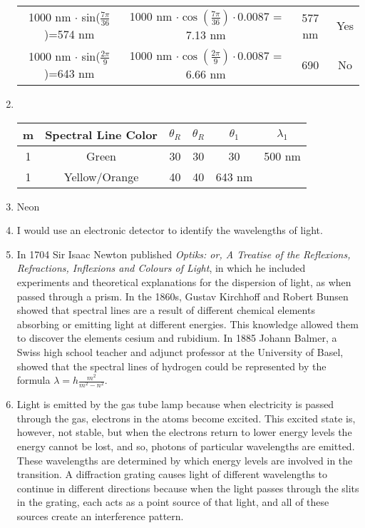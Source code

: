 \documentclass[12pt]{article}
\begin{document}
\begin{enumerate}
\begin{table}[h]
\begin{tabular}{c|c|c|c}
                1000 nm \(\cdot\) sin(\(\frac{7\pi}{36}\))=574 nm & 1000 nm \(\cdot \cos(\frac{7\pi}{36})\cdot0.0087\) = 7.13 nm & 577 nm & Yes \\
                1000 nm \(\cdot\) sin(\(\frac{2\pi}{9}\))=643 nm & 1000 nm \(\cdot \cos(\frac{2\pi}{9})\cdot0.0087\) = 6.66 nm & 690 & No
            \end{tabular}
        \end{table}\pagebreak
        \item \, 
        \begin{table}[h]
            \centering
            \begin{tabular}{c|c|c|c|c|c}
                m & Spectral Line Color & \(\theta_R\) & \(\theta_R\) & \(\theta_1 \) & \(\lambda_1\)\\
                \hline
                1 & Green & 30 & 30 & 30 & 500 nm\\
                1 & Yellow/Orange & 40 & 40 & 643 nm
            \end{tabular}
        \end{table}
        \item Neon
        \item I would use an electronic detector to identify the wavelengths of light. 
        \item In 1704 Sir Isaac Newton published \textit{Optiks: or, A Treatise of the Reflexions, Refractions, Inflexions and Colours of Light}, in which he included experiments and theoretical explanations for the dispersion of light, as when passed through a prism. In the 1860s, Gustav Kirchhoff and Robert Bunsen showed that spectral lines are a result of different chemical elements absorbing or emitting light at different energies. This knowledge allowed them to discover the elements cesium and rubidium. In 1885 Johann Balmer, a Swiss high school teacher and adjunct professor at the University of Basel, showed that the spectral lines of hydrogen could be represented by the formula \(\lambda = h \frac{m^2}{m^2-n^2}\). 
        \item Light is emitted by the gas tube lamp because when electricity is passed through the gas, electrons in the atoms become excited. This excited state is, however, not stable, but when the electrons return to lower energy levels the energy cannot be lost, and so, photons of particular wavelengths are emitted. These wavelengths are determined by which energy levels are involved in the transition. A diffraction grating causes light of different wavelengths to continue in different directions because when the light passes through the slits in the grating, each acts as a point source of that light, and all of these sources create an interference pattern.
    \end{enumerate}
\end{document}

